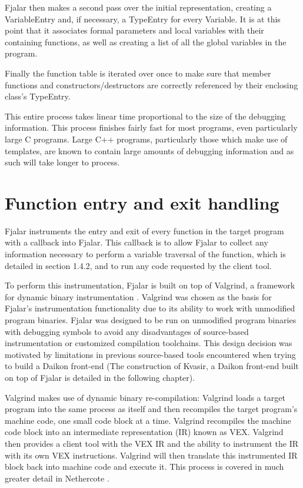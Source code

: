 \documentclass{article}
\begin{document}
Fjalar then makes a second pass over the initial representation,
creating a VariableEntry and, if necessary, a TypeEntry for every
Variable. It is at this point that it associates formal parameters and
local variables with their containing functions, as well as creating a
list of all the global variables in the program.

Finally the function table is iterated over once to make sure that
member functions and constructors/destructors are correctly referenced
by their enclosing class's TypeEntry.

This entire process takes linear time proportional to the size of the
debugging information. This process finishes fairly fast for most
programs, even particularly large C programs. Large C++ programs,
particularly those which make use of templates, are known to contain
large amounts of debugging information \cite{rotithor1999measurement}
and as such will take longer to process.

\section{Function entry and exit handling}
Fjalar instruments the entry and exit of every function in the target
program with a callback into Fjalar. This callback is to allow Fjalar
to collect any information necessary to perform a variable traversal
of the function, which is detailed in section 1.4.2, and to run any
code requested by the client tool.

To perform this instrumentation, Fjalar is built on top of Valgrind, a
framework for dynamic binary instrumentation
\cite{nethercote2007valgrind}. Valgrind was chosen as the basis for
Fjalar's instrumentation functionality due to its ability to work
with unmodified program binaries. Fjalar was designed to be run
on unmodified program binaries with debugging symbols to avoid any
disadvantages of source-based instrumentation or customized
compilation toolchains. This design decision was motivated by
limitations in previous source-based tools encountered when trying to
build a Daikon front-end \cite{Guo2006} (The construction of Kvasir, 
a Daikon front-end built on top of Fjalar is detailed in the following 
chapter).

Valgrind makes use of dynamic binary re-compilation: Valgrind loads a
target program into the same process as itself and then recompiles the
target program's machine code, one small code block at a
time. Valgrind recompiles the machine code block into an intermediate
representation (IR) known as VEX. Valgrind then provides a client tool
with the VEX IR and the ability to instrument the IR with its own VEX
instructions. Valgrind will then translate this instrumented IR block
back into machine code and execute it. This process is covered in much
greater detail in Nethercote \cite{nethercote2007valgrind}.
\end{document}
